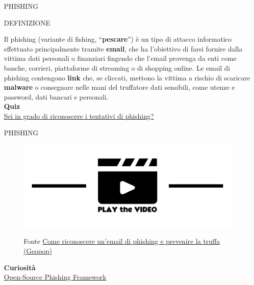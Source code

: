 \documentclass[aspectratio=1610]{beamer}
\begin{document}
\begin{frame}{PHISHING}
    \begin{alertblock}{DEFINIZIONE}
        \begin{minipage}{0.98\linewidth}
            \justifying
            Il phishing (variante di fishing, ``\textbf{pescare}'') è un tipo di attacco informatico effettuato principalmente tramite \textbf{email}, 
            che ha l'obiettivo di farsi fornire dalla vittima dati personali o finanziari fingendo che 
            l'email provenga da enti come banche, corrieri, piattaforme di streaming o di shopping online. 
            Le email di phishing contengono \textbf{link} che, se cliccati, mettono la vittima a rischio di scaricare 
            \textbf{malware} o consegnare nelle mani del truffatore dati sensibili, come utenze e password, dati bancari 
            e personali.\\
            \bigskip
            \tiny{\textbf{Quiz}}\\
            \tiny{\href{https://phishingquiz.withgoogle.com/}{Sei in grado di riconoscere i tentativi di phishing?}}
        \end{minipage}
    \end{alertblock}
\end{frame}

\begin{frame}{PHISHING}
    \begin{figure}
        \href{https://www.geopop.it/la-truffa-delle-email-cose-il-phishing-e-come-evitarlo/}{\includegraphics[width=\linewidth]{img/play.png}}
        \caption{{Fonte \href{https://www.geopop.it/la-truffa-delle-email-cose-il-phishing-e-come-evitarlo/}{Come riconoscere un’email di phishing e prevenire la truffa (Geopop)}}}
    \end{figure}   
    \bigskip
    \tiny{\textbf{Curiosità}}\\
    \tiny{\href{https://getgophish.com/}{Open-Source Phishing Framework}}      
\end{frame}
\end{document}
